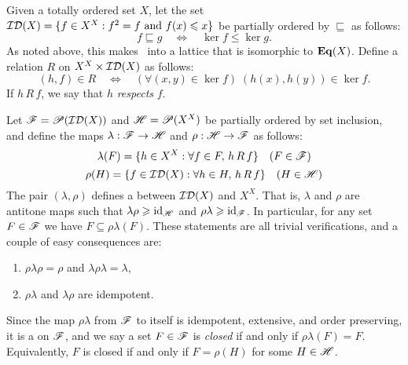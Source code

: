 Given a totally ordered set $X$, 
let the set $\mathcal{ID}(X) = \{f\in X^X: f^2 = f \text{ and } f(x) \leqslant x\}$ be partially
ordered by $\sqsubseteq$ as follows:
\[
f\sqsubseteq g \quad \Leftrightarrow \quad \ker f \leq \ker g.  
\]
As noted above, 
this makes \idemdec\ into a lattice that is isomorphic to $\mathbf{Eq}(X)$.   
Define a relation $R$ on $X^X \times \mathcal{ID}(X)$ as follows: 
\[
(h,f) \in R \quad \Leftrightarrow \quad (\forall (x,y) \in \ker f)\; (h(x),h(y))
\in \ker f.
\]
If $h\, R\, f$, we say that  $h$ \emph{respects} $f$.

Let $\mathscr{F} = \mathscr{P}(\mathcal{ID}(X))$ and $\mathscr{H} = \mathscr{P}(X^X)$ be partially ordered by set
inclusion, and define the maps 
$\lambda: \mathscr{F} \rightarrow \mathscr{H}$ and $\rho: \mathscr{H} \rightarrow \mathscr{F}$ as follows:
\[
\lambda(F) = \{h\in X^X: \forall f\in F,\, h\, R \,f\} \quad (F \in \mathscr{F})
\]
\[
\rho(H) = \{f\in \mathcal{ID}(X): \forall h\in H,\, h\, R\, f\} \quad (H \in \mathscr{H})
\]
The pair $(\lambda, \rho)$ defines a  between
$\mathcal{ID}(X)$ and $X^X$.  That is, $\lambda$ and $\rho$ are 
antitone %
maps such that $\lambda \rho \geqslant \operatorname{id}_{\mathscr{H}}$ and $\rho
\lambda \geqslant \operatorname{id}_{\mathscr{F}}$.  In particular, for any set $F \in \mathscr{F}$ we have 
$F \subseteq \rho \lambda (F)$.  These statements are all trivial verifications, and
a couple of easy consequences are:
\begin{enumerate}
\item  $\rho\lambda\rho = \rho$ and $\lambda\rho \lambda= \lambda$,
\item $\rho \lambda$ and $\lambda \rho$ are idempotent.
\end{enumerate}

Since the map $\rho \lambda$ from $\mathscr{F}$ to itself is idempotent, extensive, %
and order preserving, it is a 
on $\mathscr{F}$, and we say a set $F\in \mathscr{F}$ is
\emph{closed} if and only if $\rho\lambda(F) = F$. Equivalently,
$F$ is closed if and only if $F = \rho(H)$ for some $H\in \mathscr{H}$.
